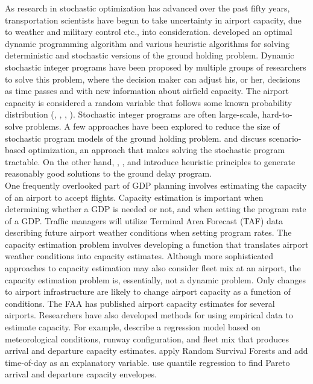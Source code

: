 \documentclass[12pt]{article}
\begin{document}
	\newline
	As research in stochastic optimization has advanced over the past fifty years, transportation scientists have begun to take uncertainty in airport capacity, due to weather and military control etc., into consideration. \cite{terrab} developed an optimal dynamic programming algorithm and various heuristic algorithms for solving deterministic and stochastic versions of the ground holding problem. Dynamic stochastic integer programs have been proposed by multiple groups of researchers to solve this problem, where the decision maker can adjust his, or her, decisions as time passes and with new information about airfield capacity. The airport capacity is considered a random variable that follows some known probability distribution (\cite{richetta1994dynamic}, \cite{mukherjee2005dynamic}, \cite{mukherjee2007dynamic}, \cite{mukherjee2012ground}). Stochastic integer programs are often large-scale, hard-to-solve problems. A few approaches have been explored to reduce the size of stochastic program models of the ground holding problem. \cite{liu2007scenario} and \cite{liu2008scenario} discuss scenario-based optimization, an approach that makes solving the stochastic program tractable. On the other hand, \cite{ball2001collaborative}, \cite{vossen2006optimization}, and \cite{ball2010ground} introduce heuristic principles to generate reasonably good solutions to the ground delay program.\\
	\newline
	One frequently overlooked part of GDP planning involves estimating the capacity of an airport to accept flights. Capacity estimation is important when determining whether a GDP is needed or not, and when setting the program rate of a GDP. Traffic managers will utilize Terminal Area Forecast (TAF) data describing future airport weather conditions when setting program rates.  The capacity estimation problem involves developing a function that translates airport weather conditions into capacity estimates.  Although more sophisticated approaches to capacity estimation may also consider fleet mix at an airport, the capacity estimation problem is, essentially, not a dynamic problem.  Only changes to airport infrastructure are likely to change airport capacity as a function of conditions.  The FAA has published airport capacity estimates for several airports.  Researchers have also developed methods for using empirical data to estimate capacity. For example, \cite{kim} describe a regression model based on meteorological conditions, runway configuration, and fleet mix that produces arrival and departure capacity estimates. \cite{gorripaty} apply Random Survival Forests and add time-of-day as an explanatory variable. \cite{ramnujam} use quantile regression to find Pareto arrival and departure capacity envelopes.\\
\end{document}
